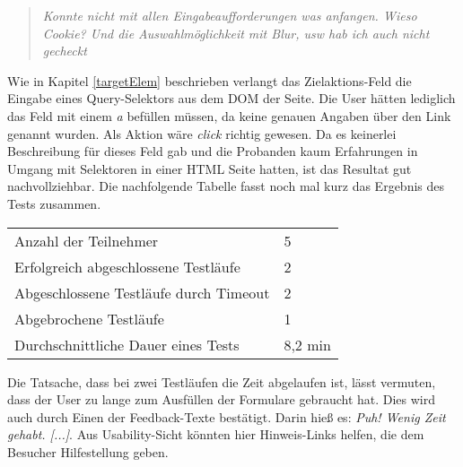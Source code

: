 \begin{quote}
     \glqq \textit{Konnte nicht mit allen Eingabeaufforderungen was anfangen.
    Wieso Cookie? Und die Auswahlmöglichkeit mit Blur, usw hab ich auch nicht gecheckt}\grqq{}
\end{quote}

Wie in Kapitel \ref{targetElem} beschrieben verlangt das Zielaktions-Feld die Eingabe eines Query-Selektors aus dem DOM der Seite. Die User hätten lediglich das Feld mit einem \glqq \textit{a}\grqq{} befüllen müssen, da keine genauen Angaben über den Link genannt wurden. Als Aktion wäre \glqq \textit{click}\grqq{} richtig gewesen. Da es keinerlei Beschreibung für dieses Feld gab und die Probanden kaum Erfahrungen in Umgang mit Selektoren in einer HTML Seite hatten, ist das Resultat gut nachvollziehbar. Die nachfolgende Tabelle fasst noch mal kurz das Ergebnis des Tests zusammen.
\\
\begin{center}
{\footnotesize
\begin{tabular}{ p{6.5cm} p{1.1cm} }
  \hline
  Anzahl der Teilnehmer & 5\vspace{0.2cm}\\
  Erfolgreich abgeschlossene Testläufe & 2\vspace{0.2cm}\\
  Abgeschlossene Testläufe durch Timeout & 2\vspace{0.2cm}\\
  Abgebrochene Testläufe & 1\vspace{0.2cm}\\
  Durchschnittliche Dauer eines Tests & 8,2 min\\
  \hline
\end{tabular}
}
\vspace{0.3cm}
 \label{tab:title}
\vspace{0.3cm}
\end{center}

Die Tatsache, dass bei zwei Testläufen die Zeit abgelaufen ist, lässt vermuten, dass der User zu lange zum Ausfüllen der Formulare gebraucht hat. Dies wird auch durch Einen der Feedback-Texte bestätigt. Darin hieß es: \glqq \textit{Puh! Wenig Zeit gehabt. [...]}\grqq{}. Aus Usability-Sicht könnten hier Hinweis-Links helfen, die dem Besucher Hilfestellung geben.